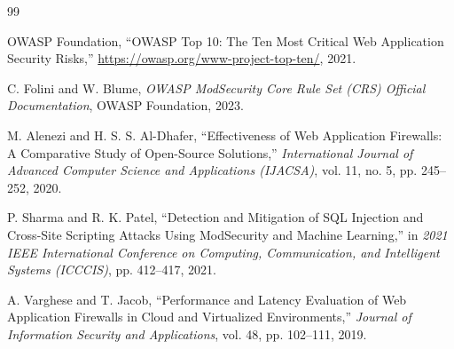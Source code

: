 \documentclass[11pt,a4paper]{article}
\begin{document}
\clearpage
\begin{thebibliography}{99}

OWASP Foundation, ``OWASP Top 10: The Ten Most Critical Web Application Security Risks,'' \url{https://owasp.org/www-project-top-ten/}, 2021.

C. Folini and W. Blume, \textit{OWASP ModSecurity Core Rule Set (CRS) Official Documentation}, OWASP Foundation, 2023.

M. Alenezi and H. S. S. Al-Dhafer, ``Effectiveness of Web Application Firewalls: A Comparative Study of Open-Source Solutions,'' \textit{International Journal of Advanced Computer Science and Applications (IJACSA)}, vol. 11, no. 5, pp. 245--252, 2020.

P. Sharma and R. K. Patel, ``Detection and Mitigation of SQL Injection and Cross-Site Scripting Attacks Using ModSecurity and Machine Learning,'' in \textit{2021 IEEE International Conference on Computing, Communication, and Intelligent Systems (ICCCIS)}, pp. 412--417, 2021.

A. Varghese and T. Jacob, ``Performance and Latency Evaluation of Web Application Firewalls in Cloud and Virtualized Environments,'' \textit{Journal of Information Security and Applications}, vol. 48, pp. 102--111, 2019.

\end{thebibliography}
\end{document}
